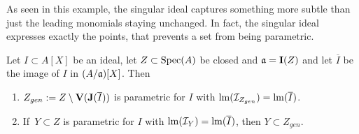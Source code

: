 As seen in this example, the singular ideal captures something more subtle than just the leading monomials staying unchanged. In fact, the singular ideal expresses exactly the points, that prevents a set from being parametric.

\begin{theorem}\label{thm:Z_gen_para}
  Let $I \subset A[X]$ be an ideal, let $Z \subset \operatorname{Spec}(A)$ be closed and $\mathfrak{a} = \operatorname{\mathbf I}(Z)$ and let $\overline I$ be the image of $I$ in $(A/\mathfrak{a})[X]$. Then
  \begin{enumerate}
    \item $Z_{gen} := Z \setminus \operatorname{\mathbf V}(\operatorname{\mathbf J}(\overline I))$ is parametric for $I$ with $\operatorname{lm}(\mathcal I_{Z_{gen}}) = \operatorname{lm}(\overline I)$.
    \item If $\,Y \subset Z$ is parametric for $I$ with $\operatorname{lm}(\mathcal I_{Y}) = \operatorname{lm}(\overline I)$, then $Y \subset Z_{gen}$.
  \end{enumerate}
\end{theorem}
